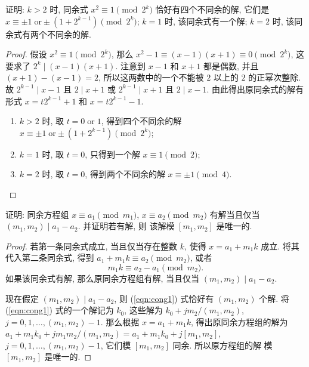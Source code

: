 \documentclass[a5paper,fleqn,10pt]{article}
\begin{document}
\begin{exmp}
	证明: $k>2$ 时, 同余式 $x^2\equiv 1\pmod{2^k}$ 恰好有四个不同余的解, 它们是 $x\equiv\pm 1\;\text{or}\pm\!(1+2^{k-1})\pmod{2^k}$;
	$k=1$ 时, 该同余式有一个解; $k=2$ 时, 该同余式有两个不同余的解.
\end{exmp}
\begin{proof}
	假设 $x^2\equiv 1\pmod{2^k}$, 那么 $x^2-1\equiv(x-1)(x+1)\equiv 0\pmod{2^k}$, 这要求了 $2^k\mid(x-1)(x+1)$.
	注意到 $x-1$ 和 $x+1$ 都是偶数, 并且 $(x+1)-(x-1)=2$, 所以这两数中的一个不能被 $2$ 以上的 $2$ 的正幂次整除. 故
	$2^{k-1}\mid x-1$ 且 $2\mid x+1$ 或 $2^{k-1}\mid x+1$ 且 $2\mid x-1$. 由此得出原同余式的解有形式 $x=t2^{k-1}+1$
	和 $x=t2^{k-1}-1$.
	\begin{enumerate}
		\item $k>2$ 时, 取 $t=0\;\text{or}\;1$, 得到四个不同余的解 $x\equiv\pm 1\;\text{or}\pm\!(1+2^{k-1})\pmod{2^k}$;
		\item $k=1$ 时, 取 $t=0$, 只得到一个解 $x\equiv 1\pmod 2$;
		\item $k=2$ 时, 取 $t=0$, 得到两个不同余的解 $x\equiv\pm 1\pmod{4}$.\qedhere
	\end{enumerate}
\end{proof}

\begin{exmp}\label{exmp:unique_solution1}
	证明: 同余方程组 $x\equiv a_1\pmod{m_1}$, $x\equiv a_2\pmod{m_2}$ 有解当且仅当 $(m_1,m_2)\mid a_1-a_2$. 并证明若有解, 则
	该解模 $[m_1,m_2]$ 是唯一的.
\end{exmp}
\begin{proof}
	若第一条同余式成立, 当且仅当存在整数 $k$, 使得 $x=a_1+m_1k$ 成立. 将其代入第二条同余式, 得到 $a_1+m_1k\equiv a_2\pmod{m_2}$, 或者
	\begin{equation}\label{eqn:cong1}
		m_1k\equiv a_2-a_1\pmod{m_2}.
	\end{equation}
	如果该同余式有解, 那么原同余方程组有解, 当且仅当 $(m_1,m_2)\mid a_1-a_2$.

	现在假定 $(m_1,m_2)\mid a_1-a_2$, 则 (\ref{eqn:cong1}) 式恰好有 $(m_1,m_2)$ 个解. 将 (\ref{eqn:cong1}) 式的一个解记为 $k_0$, 这些解为
	$k_0+jm_2/(m_1,m_2)$, $j=0,1,\ldots,(m_1,m_2)-1$. 那么根据 $x=a_1+m_1k$, 得出原同余方程组的解为
	$a_1+m_1k_0+jm_1m_2/(m_1,m_2)=a_1+m_1k_0+j[m_1,m_2]$, $j=0,1,\ldots,(m_1,m_2)-1$, 它们模 $[m_1,m_2]$ 同余. 所以原方程组的解
	模 $[m_1,m_2]$ 是唯一的.
\end{proof}
\end{document}
